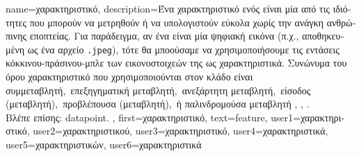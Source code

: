 {name={\foreignlanguage{greek}{χαρακτηριστικό}},
	description={\foreignlanguage{greek}{Ένα χαρακτηριστικό ενός} 
		 \foreignlanguage{greek}{είναι μία από τις ιδιότητες που μπορούν να μετρηθούν  
		ή να υπολογιστούν εύκολα χωρίς την ανάγκη ανθρώπινης εποπτείας. Για παράδειγμα, αν ένα}  
		\foreignlanguage{greek}{είναι μία ψηφιακή εικόνα (π.χ., αποθηκευμένη ως ένα αρχείο} \texttt{.jpeg}), 
		\foreignlanguage{greek}{τότε θα μποούσαμε να χρησιμοποιήσουμε τις εντάσεις κόκκινου-πράσινου-μπλε  
		των εικονοστοιχεών της ως χαρακτηριστικά. Συνώνυμα του όρου χαρακτηριστικό που χρησιμοποιούνται στον κλάδο είναι 
		\guillemotleft συμμεταβλητή,\guillemotright\ \guillemotleft επεξηγηματική μεταβλητή,\guillemotright\ 
		\guillemotleft ανεξάρτητη μεταβλητή,\guillemotright\ \guillemotleft είσοδος (μεταβλητή),\guillemotright\ 
		\guillemotleft προβλέπουσα (μεταβλητή),\guillemotright\ ή 
		\guillemotleft παλινδρομούσα μεταβλητή\guillemotright} \cite{Gujarati2021}, \cite{Dodge2003}, \cite{Everitt2022}.\\
		\foreignlanguage{greek}{Βλέπε επίσης:} \gls{datapoint}.
		}, first={\foreignlanguage{greek}{χαρακτηριστικό}},
		text={feature},
		user1={\foreignlanguage{greek}{χαρακτηριστικό}}, %
		user2={\foreignlanguage{greek}{χαρακτηριστικού}}, %
		user3={\foreignlanguage{greek}{χαρακτηριστικό}}, %
		user4={\foreignlanguage{greek}{χαρακτηριστικά}}, %
		user5={\foreignlanguage{greek}{χαρακτηριστικών}}, %
		user6={\foreignlanguage{greek}{χαρακτηριστικά}} %
}

